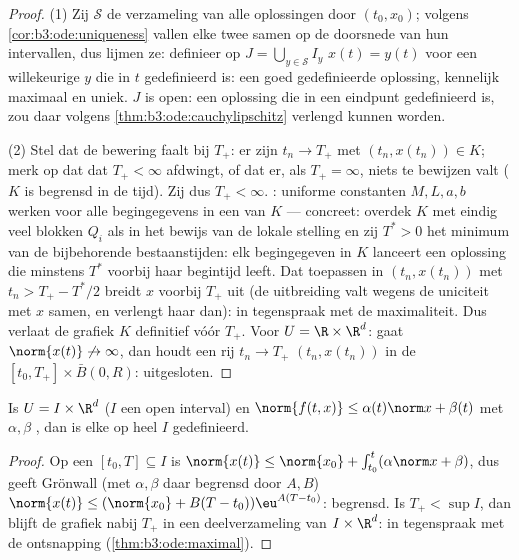 \begin{proof}
(1) Zij $\mathcal S$ de verzameling van alle oplossingen door
$(t_0, x_0)$; volgens \cref{cor:b3:ode:uniqueness} vallen elke
twee samen op de doorsnede van hun intervallen, dus lijmen ze:
definieer op $J = \bigcup_{y \in \mathcal S}I_y$ $x(t) = y(t)$
voor een willekeurige $y$ die in $t$ gedefinieerd is: een goed
gedefinieerde oplossing, kennelijk maximaal en uniek. $J$ is
open: een oplossing die in een eindpunt gedefinieerd is, zou daar
volgens \cref{thm:b3:ode:cauchylipschitz} verlengd kunnen
worden.

(2) Stel dat de bewering faalt bij $T_+$: er zijn $t_n \to T_+$
met $(t_n, x(t_n)) \in K$; merk op dat dat $T_+ < \infty$
afdwingt, of dat er, als $T_+ = \infty$, niets te bewijzen valt
($K$ is begrensd in de tijd). Zij dus $T_+ < \infty$.
: uniforme constanten $M, L, a, b$ werken voor alle
begingegevens in een  van $K$ --- concreet: overdek $K$
met eindig veel blokken $Q_i$ als in het bewijs van de lokale
stelling en zij $T^* > 0$ het minimum van de bijbehorende
bestaanstijden: elk begingegeven in $K$ lanceert een oplossing
die minstens $T^*$ voorbij haar begintijd leeft. Dat toepassen in
$(t_n, x(t_n))$ met $t_n > T_+ - T^*/2$ breidt $x$ voorbij $T_+$
uit (de uitbreiding valt wegens de uniciteit met $x$ samen, en
verlengt haar dan): in tegenspraak met de maximaliteit. Dus
verlaat de grafiek $K$ definitief vóór $T_+$. Voor $U =
\R\times\R^d$: gaat $\norm{x(t)}\not\to\infty$, dan houdt een rij
$t_n \to T_+$ $(t_n, x(t_n))$ in de  $[t_0, T_+]\times\bar
B(0, R)$: uitgesloten.
\end{proof}

\begin{corollary}
\label{cor:b3:ode:globallinear}
Is $U = I\times\R^d$ ($I$ een open interval) en $\norm{f(t, x)}
\leq \alpha(t)\norm x + \beta(t)$ met $\alpha, \beta$ ,
dan is elke  op heel $I$ gedefinieerd.
\end{corollary}

\begin{proof}
Op een  $[t_0, T] \subseteq I$ is $\norm{x(t)} \leq
\norm{x_0} + \int_{t_0}^t(\alpha\norm x + \beta)$, dus geeft
Grönwall (met $\alpha, \beta$ daar begrensd door $A, B$)
$\norm{x(t)} \leq (\norm{x_0} + B(T - t_0))\eu^{A(T - t_0)}$:
begrensd. Is $T_+ < \sup I$, dan blijft de grafiek nabij $T_+$ in
een  deelverzameling van $I\times\R^d$: in tegenspraak
met de ontsnapping (\cref{thm:b3:ode:maximal}).
\end{proof}

